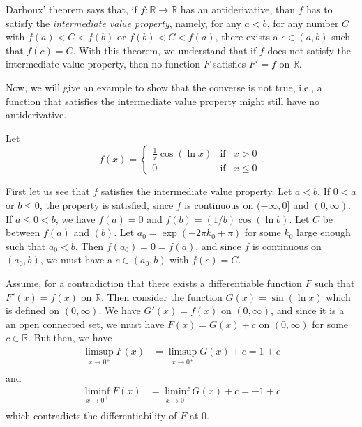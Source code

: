 \documentclass[12pt]{article}
\newcommand{\disp}{\displaystyle}
\begin{document}
Darboux' theorem says that, if $f\colon \mathbb{R} \rightarrow \mathbb{R}$ has an antiderivative, than $f$ has to satisfy the \emph{intermediate value property}, namely, for any $a<b$, for any number $C$ with $f(a)<C<f(b)$ or $f(b)<C<f(a)$, there exists a $c \in (a,b)$ such that $f(c) = C$.  With this theorem, we understand that if $f$ does not satisfy the intermediate value property, then no function $F$ satisfies $F' = f$ on $\mathbb{R}$.

Now, we will give an example to show that the converse is not true, i.e., a function that satisfies the intermediate value property might still have no antiderivative.

Let
$$
f(x) = \left\{
    \begin{array}{ccr}
          \disp \frac{1}{x}\cos(\ln x)& \mbox{if} & x>0  \\
        0 & \mbox{if} & x\leq 0
    \end{array}
  \right.  .
$$

First let us see that $f$ satisfies the intermediate value property. Let $a<b$.  If $0<a$ or $b\leq 0$, the property is satisfied, since $f$ is continuous on $(-\infty,0]$ and $(0,\infty)$. If $a\leq 0<b$, we have $f(a) = 0$ and $f(b) = (1/b)\cos(\ln b)$.  Let $C$ be between $f(a)$ and $(b)$.  Let $a_0 = \exp(-2\pi k_0 +\pi)$ for some $k_0$ large enough such that $a_0 < b$.  Then $f(a_0)=0 = f(a)$, and since $f$ is continuous on $(a_0,b)$, we must have a $c \in (a_0,b)$ with $f(c) = C$.

Assume, for a contradiction that there exists a differentiable function $F$ such that $F'(x) = f(x)$ on $\mathbb{R}$.  Then consider the function $G(x) = \sin(\ln x)$ which is defined on $(0,\infty)$.
We have $G'(x) = f(x)$ on $(0,\infty)$, and since it is a an open connected set, we must have $F(x) = G(x) + c$ on $(0,\infty)$ for some $c\in\mathbb R$. But then, we have
\begin{align*}
\limsup_{x\rightarrow 0^+} F(x) &= \limsup _{x\rightarrow 0^+} G(x) + c  = 1+c\\
\end{align*}
and
\begin{align*}
\liminf_{x\rightarrow 0^+} F(x) &= \liminf _{x\rightarrow 0^+} G(x) + c  = -1+c\\
\end{align*}
which contradicts the differentiability of $F$ at $0$.
\end{document}
